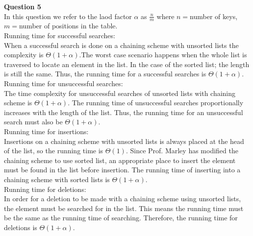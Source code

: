 \documentclass{article}
\begin{document}
{\bf Question 5}\\
In this question we refer to the laod factor $\alpha$ as $\frac{n}{m}$ where $n=$number of keys, $m=$number of positions in the table.\\

\smallskip
Running time for successful searches:\\
When a successful search is done on a chaining scheme with unsorted lists the complexity is $\Theta(1+\alpha)$.The worst case scenario happens when the whole list is traversed to locate an element in the list. In the case of the sorted list; the length is still the same. Thus, the running time for a successful searches is $\Theta(1+\alpha)$.\\

Running time for unsuccessful searches:\\
The time complexity for unsuccessful searches of unsorted lists with chaining scheme is $\Theta(1+\alpha)$. The running time of unsuccessful searches proportionally increases with the length of the list. Thus, the running time for an unsuccessful search must also be $\Theta(1+\alpha)$.\\

Running time for insertions:\\
Insertions on a chaining scheme with unsorted lists is always placed at the head of the list, so the running time is $\Theta(1)$. Since Prof. Marley has modified the chaining scheme to use sorted list, an appropriate place to insert the element must be found in the list before insertion. The running time of inserting into a chaining scheme with sorted lists is $\Theta(1+\alpha)$.\\

Running time for deletions:\\
In order for a deletion to be made with a chaining scheme using unsorted lists, the element must be searched for in the list. This means the running time must be the same as the running time of searching. Therefore, the running time for deletions is $\Theta(1+\alpha)$.
\end{document}
